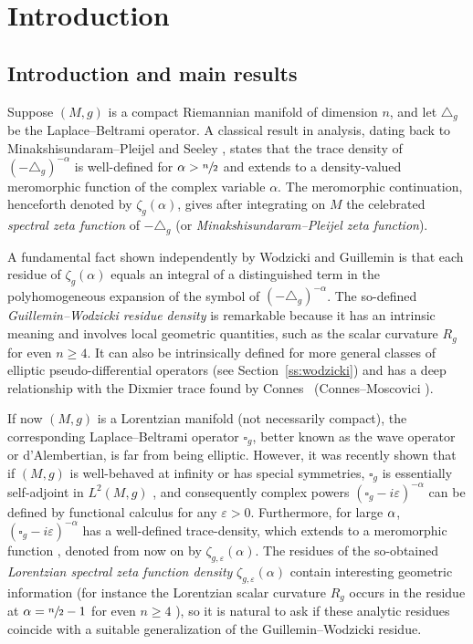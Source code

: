 \documentclass[JEP,XML,SOM,Unicode]{cedram}
\theoremstyle{definition}
\let\cv\alpha
\let\Re\relax
\DeclareMathOperator{\Re}{Re}
\renewcommand{\sec}[1]{Section~\ref{#1}}
\def\sn2{\sfrac{n}{2}}
\begin{document}
\section{Introduction}

\subsection{Introduction and main results} Suppose $(M,g)$ is a compact Riemannian manifold of dimension $n$, and let $\triangle_g$ be the Laplace--Beltrami operator. A classical result in analysis, dating back to Minakshisundaram--Pleijel \cite{Minakshisundaram1949} and Seeley \cite{seeley}, states that the trace density of $(-\triangle_g)^{-\cv}$ is well-defined for $\Re \cv > \sn2$ and extends to a density-valued meromorphic function of the complex variable $\cv$. The meromorphic continuation, henceforth denoted by $\zeta_g(\cv)$, gives after integrating on $M$ the celebrated \emph{spectral zeta function} of $-\triangle_g$ (or \emph{Minakshisundaram--Pleijel zeta function}).

A fundamental fact shown independently by Wodzicki \cite{wodzicki} and Guillemin \cite{Guillemin1985} is that each residue of $\zeta_g(\cv)$ equals an integral of a distinguished term in the polyhomogeneous expansion of the symbol of $(-\triangle_g)^{-\cv}$. The so-defined \emph{Guillemin--Wodzicki residue density} is remarkable because it has an {intrinsic} meaning and involves local geometric quantities, such as the scalar curvature $R_g$ for even $n\geqslant 4$. It can also be intrinsically defined for more general classes of elliptic pseudo-differential operators (see \sec{ss:wodzicki}) and has a deep relationship with the Dixmier trace found by Connes~\cite{Connes1988} (\cf Connes--Moscovici \cite{Connes1995}).

If now $(M,g)$ is a Lorentzian manifold (not necessarily compact), the corresponding Laplace--Beltrami operator $\square_g$, better known as the wave operator or d'Alembertian, is far from being elliptic. However, it was recently shown that if $(M,g)$ is well-behaved at infinity or has special symmetries, $\square_g$ is essentially self-adjoint in $L^2(M,g)$ \cite{derezinski,vasyessential,nakamurataira,Derezinski2019}, and consequently complex powers $(\square_g-i \varepsilon)^{-\cv}$ can be defined by functional calculus for any $\varepsilon>0$. Furthermore, for large $\Re \cv$, $(\square_g-i \varepsilon)^{-\cv}$ has a well-defined trace-density, which extends to a meromorphic function \cite{Dang2020}, denoted from now on by $\zeta_{g,\varepsilon}(\cv)$. The residues of the so-obtained \emph{Lorentzian spectral zeta function density} $\zeta_{g,\varepsilon}(\cv)$ contain interesting geometric information (for instance the Lorentzian scalar curvature $R_g$ occurs in the residue at $\cv=\sfrac{n}{2}-1$ for even $n\geqslant4$ \cite{Dang2020}), so it is natural to ask if these analytic residues coincide with a suitable generalization of the Guillemin--Wodzicki residue.
\end{document}

